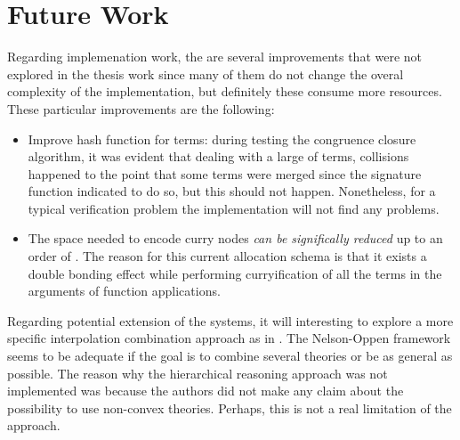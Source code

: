 \chapter{Future Work}

Regarding implemenation work, the are several improvements that were not explored 
in the thesis work since many of them do not change the overal complexity 
of the implementation, but definitely these consume more resources.
These particular improvements are the following:

\begin{itemize}
  \item Improve hash function for terms: during testing the congruence closure
    algorithm, it was evident that dealing with a large of terms, collisions
    happened  to the point that some terms were merged since the signature
    function indicated to do so, but this should not happen. Nonetheless, for
    a typical verification problem the implementation will not find any problems.
  \item The space needed to encode curry nodes \emph{can be significally reduced
    } up to an order of . The reason for this current allocation schema
    is that it exists a double bonding effect while performing curryification 
    of all the terms in the arguments of function applications.
\end{itemize}

Regarding potential extension of the systems, it will interesting to explore a
more specific interpolation combination approach as in \cite{10.1007/978-3-540-69738-1_25}.
The Nelson-Oppen framework seems to be adequate if the goal is to combine several theories
or be as general as possible. The reason why the hierarchical reasoning approach
was not implemented was because the authors did not make any claim about the possibility
to use non-convex theories. Perhaps, this is not a real limitation of the approach.

